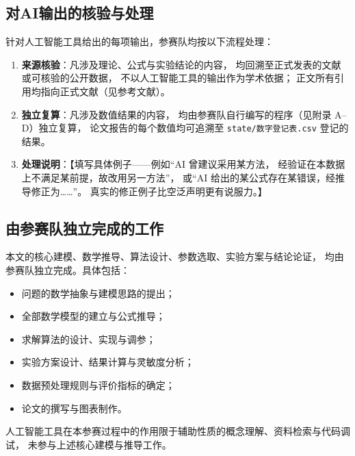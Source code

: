 \documentclass[bwprint]{gmcmthesis}
\numberwithin{equation}{section}
\numberwithin{figure}{section}
\numberwithin{table}{section}
\begin{document}
\begin{appendices}
\subsection{对AI输出的核验与处理}

针对人工智能工具给出的每项输出，参赛队均按以下流程处理：

\begin{enumerate}
  \item \textbf{来源核验}：凡涉及理论、公式与实验结论的内容，
        均回溯至正式发表的文献或可核验的公开数据，
        不以人工智能工具的输出作为学术依据；
        正文所有引用均指向正式文献（见参考文献）。
  \item \textbf{独立复算}：凡涉及数值结果的内容，
        均由参赛队自行编写的程序（见附录 A--D）独立复算，
        论文报告的每个数值均可追溯至 \texttt{state/数字登记表.csv} 登记的结果。
  \item \textbf{处理说明}：【填写具体例子——例如“AI 曾建议采用某方法，
        经验证在本数据上不满足某前提，故改用另一方法”，
        或“AI 给出的某公式存在某错误，经推导修正为……”。
        真实的修正例子比空泛声明更有说服力。】
\end{enumerate}


\subsection{由参赛队独立完成的工作}

本文的核心建模、数学推导、算法设计、参数选取、实验方案与结论论证，
均由参赛队独立完成。具体包括：

\begin{itemize}
  \item 问题的数学抽象与建模思路的提出；
  \item 全部数学模型的建立与公式推导；
  \item 求解算法的设计、实现与调参；
  \item 实验方案设计、结果计算与灵敏度分析；
  \item 数据预处理规则与评价指标的确定；
  \item 论文的撰写与图表制作。
\end{itemize}

人工智能工具在本参赛过程中的作用限于辅助性质的概念理解、资料检索与代码调试，
未参与上述核心建模与推导工作。

\end{appendices}
\end{document}
